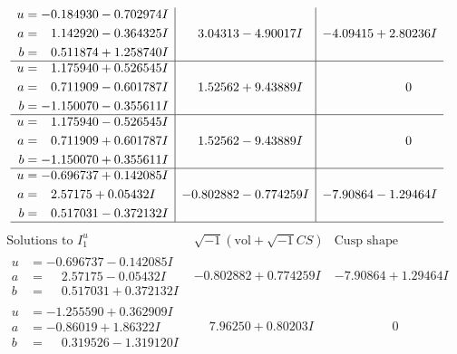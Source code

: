 \documentclass[1p]{elsarticle_modified}
\theoremstyle{definition}
\newcommand{\I}{\sqrt{-1}}
\begin{document}
$$\begin{array}{c|c|c}
\begin{aligned}
u &= -0.184930 - 0.702974 I \\
a &= \phantom{-}1.142920 - 0.364325 I \\
b &= \phantom{-}0.511874 + 1.258740 I\end{aligned}
 & \phantom{-}3.04313 - 4.90017 I & -4.09415 + 2.80236 I \\ \hline\begin{aligned}
u &= \phantom{-}1.175940 + 0.526545 I \\
a &= \phantom{-}0.711909 - 0.601787 I \\
b &= -1.150070 - 0.355611 I\end{aligned}
 & \phantom{-}1.52562 + 9.43889 I & \phantom{-0.000000 } 0 \\ \hline\begin{aligned}
u &= \phantom{-}1.175940 - 0.526545 I \\
a &= \phantom{-}0.711909 + 0.601787 I \\
b &= -1.150070 + 0.355611 I\end{aligned}
 & \phantom{-}1.52562 - 9.43889 I & \phantom{-0.000000 } 0 \\ \hline\begin{aligned}
u &= -0.696737 + 0.142085 I \\
a &= \phantom{-}2.57175 + 0.05432 I \\
b &= \phantom{-}0.517031 - 0.372132 I\end{aligned}
 & -0.802882 - 0.774259 I & -7.90864 - 1.29464 I\\
 \hline 
 \end{array}$$\newpage$$\begin{array}{c|c|c}  
\text{Solutions to }I^u_{1}& \I (\text{vol} + \sqrt{-1}CS) & \text{Cusp shape}\\
 \hline 
\begin{aligned}
u &= -0.696737 - 0.142085 I \\
a &= \phantom{-}2.57175 - 0.05432 I \\
b &= \phantom{-}0.517031 + 0.372132 I\end{aligned}
 & -0.802882 + 0.774259 I & -7.90864 + 1.29464 I \\ \hline\begin{aligned}
u &= -1.255590 + 0.362909 I \\
a &= -0.86019 + 1.86322 I \\
b &= \phantom{-}0.319526 - 1.319120 I\end{aligned}
 & \phantom{-}7.96250 + 0.80203 I & \phantom{-0.000000 } 0 \\ \hline\begin{aligned}

\end{aligned}
\end{array}$$
\end{document}
